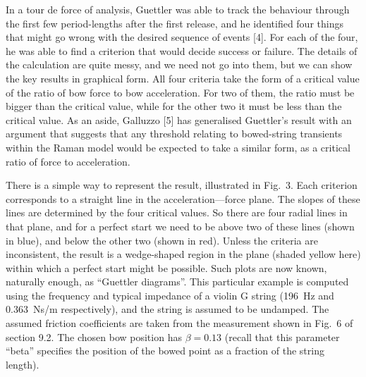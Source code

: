 
  In a tour de force of analysis, Guettler was able to track the behaviour 
  through the first few period-lengths after the first release, and he 
  identified four things that might go wrong with the desired sequence of 
  events [4]. For each of the four, he was able to find a criterion that would 
  decide success or failure. The details of the calculation are quite messy, 
  and we need not go into them, but we can show the key results in graphical 
  form. All four criteria take the form of a critical value of the ratio of bow 
  force to bow acceleration. For two of them, the ratio must be bigger than the 
  critical value, while for the other two it must be less than the critical 
  value. As an aside, Galluzzo [5] has generalised Guettler's result with an 
  argument that suggests that any threshold relating to bowed-string transients 
  within the Raman model would be expected to take a similar form, as a 
  critical ratio of force to acceleration. 

  There is a simple way to represent the result, illustrated in Fig.\ 3. Each 
  criterion corresponds to a straight line in the acceleration—force plane. The 
  slopes of these lines are determined by the four critical values. So there 
  are four radial lines in that plane, and for a perfect start we need to be 
  above two of these lines (shown in blue), and below the other two (shown in 
  red). Unless the criteria are inconsistent, the result is a wedge-shaped 
  region in the plane (shaded yellow here) within which a perfect start might 
  be possible. Such plots are now known, naturally enough, as ``Guettler 
  diagrams''. This particular example is computed using the frequency and 
  typical impedance of a violin G string (196~Hz and 0.363~Ns/m respectively), 
  and the string is assumed to be undamped. The assumed friction coefficients 
  are taken from the measurement shown in Fig.\ 6 of section 9.2. The chosen 
  bow position has $\beta=0.13$ (recall that this parameter “beta” specifies 
  the position of the bowed point as a fraction of the string length). 


